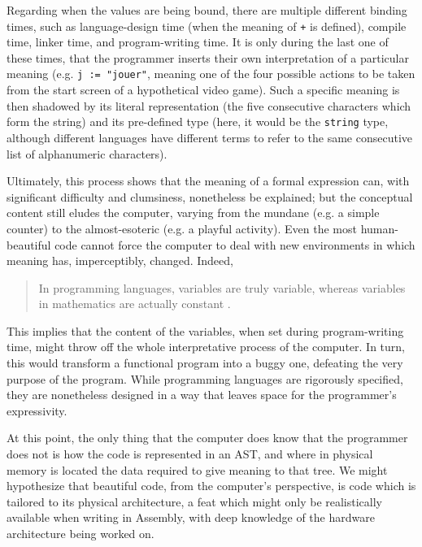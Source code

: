 Regarding when the values are being bound, there are multiple different binding times, such as language-design time (when the meaning of \lstinline{+} is defined), compile time, linker time, and program-writing time. It is only during the last one of these times, that the programmer inserts their own interpretation of a particular meaning (e.g. \lstinline{j := "jouer"}, meaning one of the four possible actions to be taken from the start screen of a hypothetical video game). Such a specific meaning is then shadowed by its literal representation (the five consecutive characters which form the string) and its pre-defined type (here, it would be the \lstinline{string} type, although different languages have different terms to refer to the same consecutive list of alphanumeric characters).

Ultimately, this process shows that the meaning of a formal expression can, with significant difficulty and clumsiness, nonetheless be explained; but the conceptual content still eludes the computer, varying from the mundane (e.g. a simple counter) to the almost-esoteric (e.g. a playful activity). Even the most human-beautiful code cannot force the computer to deal with new environments in which meaning has, imperceptibly, changed. Indeed,

\begin{quote}
  In programming languages, variables are truly variable, whereas variables in mathematics are actually constant \citep{wirth_essence_2003}.
\end{quote}

This implies that the content of the variables, when set during program-writing time, might throw off the whole interpretative process of the computer. In turn, this would transform a functional program into a buggy one, defeating the very purpose of the program. While programming languages are rigorously specified, they are nonetheless designed in a way that leaves space for the programmer's expressivity. %

At this point, the only thing that the computer does know that the programmer does not is how the code is represented in an AST, and where in physical memory is located the data required to give meaning to that tree\citep{stansifer_study_1994}. We might hypothesize that beautiful code, from the computer's perspective, is code which is tailored to its physical architecture, a feat which might only be realistically available when writing in Assembly, with deep knowledge of the hardware architecture being worked on.

